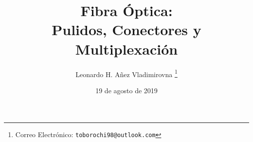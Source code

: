 

\title{Fibra Óptica: \\ Pulidos, Conectores y Multiplexación}

\author{Leonardo H. Añez Vladimirovna%
  \thanks{Correo Electrónico: \texttt{toborochi98@outlook.com}}}
\date{19 de agosto de 2019}

\maketitle




